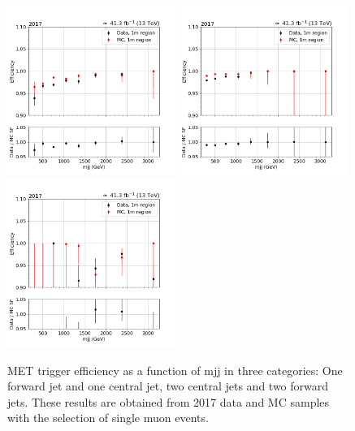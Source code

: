 \begin{figure}[htp]
    \begin{center}
        \includegraphics[width=0.49\textwidth]{fig/efficiency/trigger/met/mjj/data_mc_comparison_1m_2017_one_jet_forward_one_jet_central.png}
        \includegraphics[width=0.49\textwidth]{fig/efficiency/trigger/met/mjj/data_mc_comparison_1m_2017_two_central_jets.png} \\
        \includegraphics[width=0.49\textwidth]{fig/efficiency/trigger/met/mjj/data_mc_comparison_1m_2017_two_forward_jets.png}
    \end{center}
    \caption{MET trigger efficiency as a function of mjj in three categories: One forward jet and one central jet, two central jets and
            two forward jets. These results are obtained from 2017 data and MC samples with the selection of single muon events.} 
    \label{fig:eff_mjj_2017_1m}      
\end{figure}

